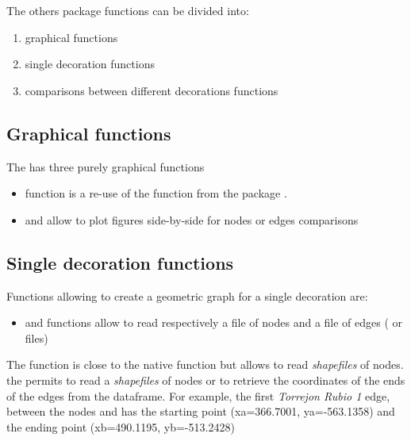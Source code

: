 \documentclass[article]{jss}
\begin{document}
The others  package functions can be divided into:
\begin{enumerate}
 \item graphical functions
 \item single decoration functions
 \item comparisons between different decorations functions
\end{enumerate}

\subsection{Graphical functions} \label{sec:functions_gr}

The  has three purely graphical functions
\begin{itemize}
\setlength\itemsep{.1em}
\item {} function is a re-use of the  function from the  package \citep{Snow20}.
\item {} and  allow to plot figures side-by-side for nodes or edges comparisons
\end{itemize}

\subsection{Single decoration functions} \label{sec:functions_one}

Functions allowing to create a geometric graph for a single decoration are:

\begin{itemize}
  \item {} and  functions allow to read respectively a file of nodes and a file of edges ( or  files)
\end{itemize}

The  function is close to the native  function but allows to read \emph{shapefiles} of nodes.\\
the  permits to read a \emph{shapefiles} of nodes or to retrieve the coordinates of the ends of the edges from the  dataframe. For example, the first \emph{Torrejon Rubio 1} edge, between the nodes  and  has
the starting point (xa=366.7001, ya=-563.1358) and the ending point (xb=490.1195, yb=-513.2428)
\end{document}
